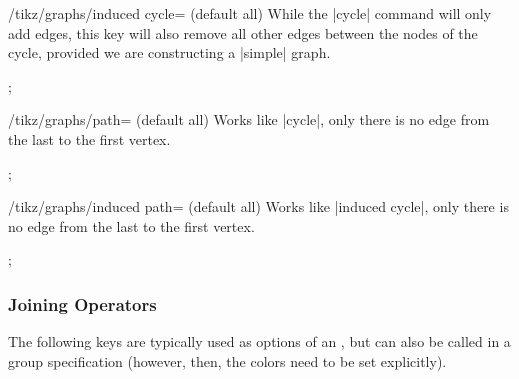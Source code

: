 \begin{key}{/tikz/graphs/induced cycle= (default all)}
  While the |cycle| command will only add edges, this key will also
  remove all other edges between the nodes of the cycle, provided we
  are constructing a |simple| graph.
\begin{codeexample}[]
\tikz {};    
\end{codeexample}
\end{key}
  
\begin{key}{/tikz/graphs/path= (default all)}
  Works like |cycle|, only there is no edge from the last to the first
  vertex. 
\begin{codeexample}[]
\tikz {};    
\end{codeexample}
\end{key}
\begin{key}{/tikz/graphs/induced path= (default all)}
  Works like |induced cycle|, only there is no edge from the last to the first
  vertex. 
\begin{codeexample}[]
\tikz {};    
\end{codeexample}
\end{key}


\subsubsection{Joining Operators}

The following keys are typically used as options of an , but can also be called in a group specification
(however, then, the colors need to be set explicitly).

